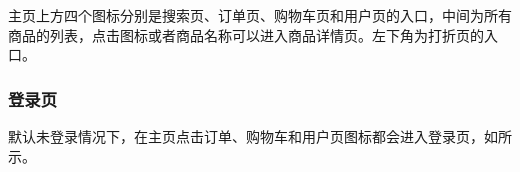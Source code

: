 \documentclass[lang=cn,11pt,a4paper,cite=authornum]{paper}
\begin{document}
主页上方四个图标分别是搜索页、订单页、购物车页和用户页的入口，中间为所有商品的列表，点击图标或者商品名称可以进入商品详情页。左下角为打折页的入口。

\subsubsection{登录页}

默认未登录情况下，在主页点击订单、购物车和用户页图标都会进入登录页，如所示。

\begin{figure}[htbp]

    \centering
    


\end{figure}
\end{document}
